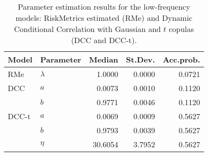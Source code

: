 \begin{table}[ht]
\centering
\caption{Parameter estimation results for the low-frequency models:
             RiskMetrics estimated (RMe) and Dynamic Conditional Correlation
             with Gaussian and $t$ copulas (DCC and DCC-t).} 
\label{table:all_pars_lf}
\begingroup\footnotesize
\begin{tabular}{llrrr}
  \hline
Model & Parameter & Median & St.Dev. & Acc.prob. \\ 
  \hline
RMe & $\lambda$ & 1.0000 & 0.0000 & 0.0721 \\ 
  DCC & $a$ & 0.0073 & 0.0010 & 0.1120 \\ 
   & $b$ & 0.9771 & 0.0046 & 0.1120 \\ 
  DCC-t & $a$ & 0.0069 & 0.0009 & 0.5627 \\ 
   & $b$ & 0.9793 & 0.0039 & 0.5627 \\ 
   & $\eta$ & 30.6054 & 3.7952 & 0.5627 \\ 
   \hline
\end{tabular}
\endgroup
\end{table}
